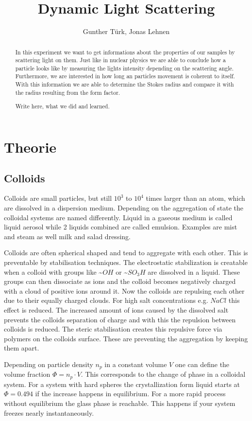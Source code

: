 \documentclass[]{article}
\title{Dynamic Light Scattering}
\author{Gunther T\"urk, Jonas Lehnen}
\begin{document}
\maketitle
\tableofcontents
\begin{abstract}
In this experiment we want to get informations about the properties of our samples by scattering light on them. Just like in nuclear physics we are able to conclude how a particle looks like by measuring the lights intensity depending on the scattering angle. Furthermore, we are interested in how long an particles movement is coherent to itself. With this information we are able to determine the Stokes radius and compare it with the radius resulting from the form factor.


Write here, what we did and learned.
\end{abstract}


\section{Theorie}
\subsection{Colloids}
Colloids are small particles, but still $10^3$ to $10^4$ times larger than an atom, which are dissolved in a dispersion medium. Depending on the aggregation of state the colloidal systems are named differently. Liquid in a gaseous medium is called liquid aerosol while 2 liquids combined are called emulsion. Examples are mist and steam as well milk and salad dressing.

Colloids are often spherical shaped and tend to aggregate with each other. This is preventable by stabilisation techniques. The electrostatic stabilization is creatable when a colloid with groups like \textasciitilde$OH$ or \textasciitilde$SO_3H$ are dissolved in a liquid. These groups  can then dissociate as ions and the colloid becomes negatively charged with a cloud of positive ions around it. Now the colloids are repulsing each other due to their equally charged clouds. For high salt concentrations e.g. $NaCl$ this effect is reduced. The increased amount of ions caused by the dissolved salt prevents the colloids separation of charge and with this the repulsion between colloids is reduced. 
The steric stabilisation creates this repulsive force via polymers on the colloids surface. These are preventing the aggregation by keeping them apart.

Depending on particle density $n_p$ in a constant volume $V$ one can define the volume fraction $\Phi = n_p \cdot V$. This corresponds to the change of phase in a colloidal system. For a system with hard spheres the crystallization form liquid starts at $\Phi=0.494$ if the increase happens in equilibrium. For a more rapid process without equilibrium the glass phase is reachable. This happens if your system freezes nearly instantaneously.  
\end{document}
